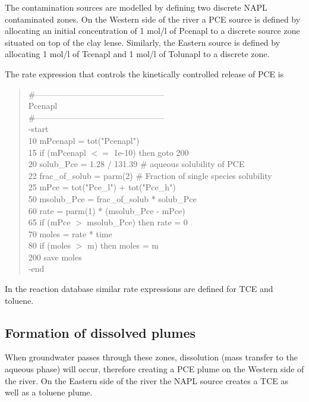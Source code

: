 The contamination sources are modelled by defining two discrete NAPL contaminated zones.
On the Western side of the river a PCE source is defined by allocating an initial 
concentration of 1 mol/l of Pcenapl to a discrete source zone situated on top of the clay lense.
Similarly, the Eastern source is defined by allocating 1 mol/l of Tcenapl and 1 mol/l of Tolunapl 
to a discrete zone.

The rate expression that controls the kinetically controlled release of PCE is \\

{\color{red}
\begin{quote}   
\#----------------------------------------------- \\
Pcenapl		\\
\#----------------------------------------------- \\
  -start \\
   10  mPcenapl = tot("Pcenapl") \\
   15  if (mPcenapl $<=$ 1e-10) then goto 200 \\
   20  solub\_Pce = 1.28 / 131.39 \# aqueous solubility of PCE \\
   22  frac\_of\_solub = parm(2) \# Fraction of single species solubility\\
   25  mPce = tot("Pce\_l") + tot("Pce\_h") \\
   50  msolub\_Pce =  frac\_of\_solub * solub\_Pce \\
   60  rate = parm(1) * (msolub\_Pce - mPce) \\
   65  if (mPce $>$ msolub\_Pce) then rate = 0 \\
   70  moles = rate * time \\
   80  if (moles $>$ m) then moles = m \\
   200 save moles \\
  -end \\
 \end{quote}
 }
 
 In the reaction database similar rate expressions are defined for TCE and toluene.
 
\subsection[Formation of dissolved plumes]{Formation of dissolved plumes}

When groundwater passes through these zones, dissolution (mass transfer to the aqueous phase) will
occur, therefore creating a PCE plume on the Western side of the river. On the Eastern side of the 
river the NAPL source creates a TCE as well as a toluene plume. 

